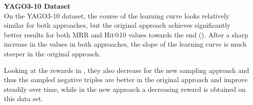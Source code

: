 \textbf{YAGO3-10 Dataset}
\label{subsubsec:uncertainty_yago3_10}\\
%
On the \textsc{YAGO3-10} dataset, the course of the learning curve looks relatively similar for both approaches, but the original approach achieves significantly better results for both MRR and Hit@10 values towards the end ().
After a sharp increase in the values in both approaches, the slope of the learning curve is much steeper in the original \kbgan approach.

Looking at the rewards in , they also decrease for the new sampling approach and thus the sampled negative triples are better in the original approach and improve steadily over time, while in the new approach a decreasing reward is obtained on this data set.
\clearpage
